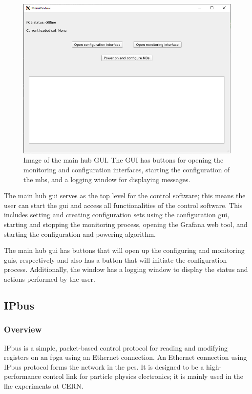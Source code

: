 \documentclass[main.tex]{subfiles}
\begin{document}
\begin{figure}[!ht]
    \centering
    \includegraphics[scale=0.65]{images/main_gui.png}
    \caption{Image of the main hub GUI. The GUI has buttons for opening the monitoring and configuration interfaces, starting the configuration of the \gls{mb}s, and a logging window for displaying messages.}
    \label{fig: main_gui}
\end{figure}
\FloatBarrier 

The main hub \gls{gui} serves as the top level for the control software; this means the user can start the \gls{gui} and access all functionalities of the control software. This includes setting and creating configuration sets using the configuration \gls{gui}, starting and stopping the monitoring process, opening the Grafana web tool, and starting the configuration and powering algorithm.

The main hub \gls{gui} has buttons that will open up the configuring and monitoring \gls{gui}s, respectively and also has a button that will initiate the configuration process. Additionally, the window has a logging window to display the status and actions performed by the user.


\subsection{IPbus}
\label{ssec: IPbus}
 \subsubsection{Overview}
 
 IPbus is a simple, packet-based control protocol for reading and modifying registers on an \gls{fpga} using an Ethernet connection. An Ethernet connection using IPbus protocol forms the network in the \gls{pcs}. It is designed to be a high-performance control link for particle physics electronics; it is mainly used in the \gls{lhc} experiments at CERN.
 
\end{document}
